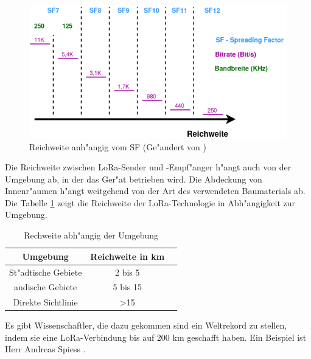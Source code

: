 \begin{figure}[h]
	\centering
	\includegraphics[width=14cm]{source/images/SF}
	\caption{Reichweite anh"angig vom SF (Ge"andert von \cite{Entcription}) 
	\label{fig:SF}}
\end{figure}

Die Reichweite zwischen LoRa-Sender und -Empf"anger h"angt auch von der 
Umgebung ab, in der das Ger"at betrieben wird. Die Abdeckung von 
Innenr"aumen h"angt weitgehend von der Art des verwendeten Baumaterials 
ab. Die Tabelle \ref{tab:Range} zeigt die Reichweite der 
LoRa-Technologie in Abh"angigkeit zur Umgebung.

\begin{center}
	\begin{table}[htbp] 
		\centering 
		\Large
		\begin{tabular}{c|c|c}
			\textbf{Umgebung} & \textbf{Reichweite in km} \\
			\hline
			St"adtische Gebiete	& 2 bis 5 \\
			\hline
			andische Gebiete & 5 bis 15\\
			\hline
			Direkte Sichtlinie	& >15 
		\end{tabular} 
		\caption{Rechweite abh"angig der Umgebung} 
		\label{tab:Range} 
		
	\end{table}
\end{center}

Es gibt Wissenschaftler, die dazu gekommen sind ein Weltrekord zu 
stellen, indem sie eine LoRa-Verbindung bis auf 200 km geschafft haben. 
Ein Beispiel ist Herr Andreas Spiess \cite{AndreasSpiess}.

